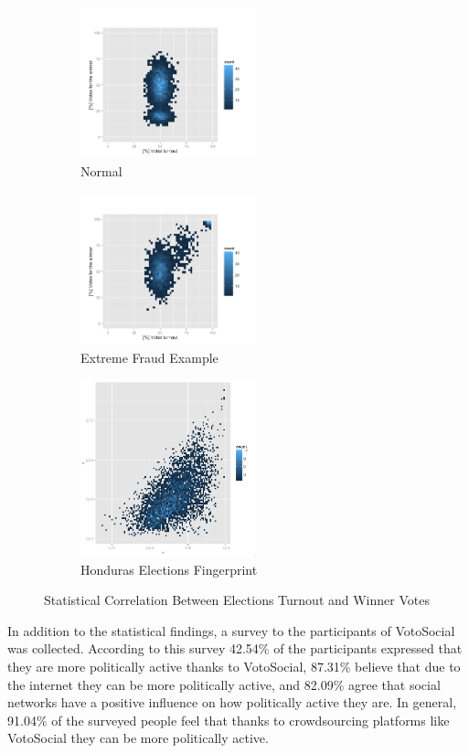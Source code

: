 \documentclass[letterpaper,10pt]{article}
\begin{document}
\begin{figure}
\centering
\begin{subfigure}{.3\textwidth}
  \centering
  \includegraphics[width=2in]{images/normal}
  \caption{Normal}
  \label{fig:normal}
\end{subfigure}%
\begin{subfigure}{.3\textwidth}
  \centering
  \includegraphics[width=2in]{images/extreme}
  \caption{Extreme Fraud Example}
  \label{fig:extreme}
\end{subfigure}
\begin{subfigure}{.3\textwidth}
  \centering
  \includegraphics[width=2in]{images/fingerprint}
  \caption{Honduras Elections Fingerprint}
  \label{fig:fingerprint}
\end{subfigure}

\caption{Statistical Correlation Between Elections Turnout and Winner Votes}
\label{fig:test}
\end{figure}

In addition to the statistical findings, a survey to the participants of VotoSocial was collected. According to this survey 42.54\% of the participants expressed that they are more politically active thanks to VotoSocial, 87.31\% believe that due to the internet they can be more politically active, and 82.09\% agree that social networks have a positive influence on how politically active they are. In general, 91.04\% of the surveyed people feel that thanks to crowdsourcing platforms like VotoSocial they can be more politically active.
\end{document}
